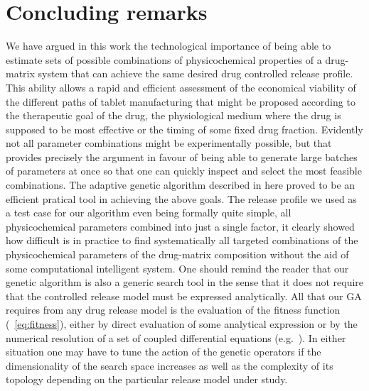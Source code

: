\documentclass[superbib,unsortedaddress,preprint,byrevtex,aps,noshowpacs,titlepage]{revtex4}
\begin{document}
\section{Concluding remarks}

We have argued in this work the technological importance of being able to estimate 
sets of possible combinations of physicochemical properties of a drug-matrix system 
that can achieve the same desired drug controlled release profile.
This ability allows a rapid and efficient assessment of the economical viability
of the different paths of tablet manufacturing that might be proposed according to the
therapeutic goal of the drug, the physiological medium where the drug is supposed to 
be most effective or the timing of some fixed drug fraction.
Evidently not all parameter combinations might be experimentally possible, but that 
provides precisely the argument in favour of being able to generate large batches 
of parameters at once so that one can quickly inspect and select the most feasible 
combinations.
The adaptive genetic algorithm described in here proved to be an efficient pratical tool 
in achieving the above goals.
%
%
The release profile we used as a test case for our algorithm even being formally quite
simple, all physicochemical parameters combined into just a single factor, it clearly 
showed how difficult is in practice to find systematically all targeted combinations
of the physicochemical parameters of the drug-matrix composition without the aid of 
some computational intelligent system.  
One should remind the reader that our genetic algorithm is also a generic
search tool in the sense that it does not require that the controlled release model 
must be expressed analytically.
All that our GA requires from any drug release model is the evaluation of the fitness function
 (~\ref{eq:fitness}), either by direct evaluation of some analytical expression or by the 
numerical resolution of a set of coupled differential equations (e.g.~\cite{Siepmann2000,Siepmann2002}).
In either situation one may have to tune the action of the genetic operators if
the dimensionality of the search space increases as well as the complexity of its 
topology depending on the particular release model under study.
\end{document}
